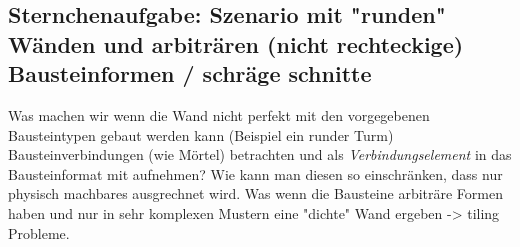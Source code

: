 \subsection{Sternchenaufgabe: Szenario mit "runden" Wänden und arbiträren (nicht rechteckige) Bausteinformen / schräge schnitte}
Was machen wir wenn die Wand nicht perfekt mit den vorgegebenen Bausteintypen gebaut werden kann (Beispiel ein runder Turm)
Bausteinverbindungen (wie Mörtel) betrachten und als \textit{Verbindungselement} in das Bausteinformat mit aufnehmen? Wie kann man diesen so einschränken, dass nur physisch machbares ausgrechnet wird.
Was wenn die Bausteine arbiträre Formen haben und nur in sehr komplexen Mustern eine "dichte" Wand ergeben -> tiling Probleme.